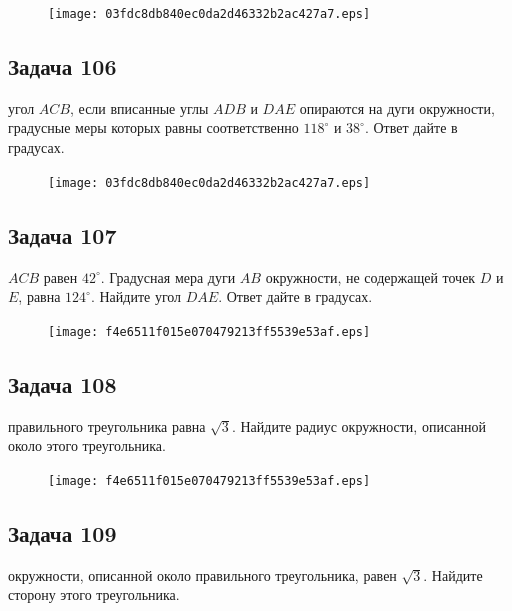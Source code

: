 \documentclass[a4paper,10pt]{article} %
\begin{document}
\begin{spacing}{1.0}
{\begin{figure}{\texttt{[image: 03fdc8db840ec0da2d46332b2ac427a7.eps]}}\end{figure}
\subsection*{Задача 106}
 угол $ACB$, если вписанные углы $ADB$ и $DAE$ опираются на дуги окружности, градусные меры которых равны соответственно $118^\circ$ и $38^\circ$. Ответ дайте в градусах.

\vspace{1.5cm}

\begin{figure}{\texttt{[image: 03fdc8db840ec0da2d46332b2ac427a7.eps]}}\end{figure}
\subsection*{Задача 107}
 $ACB$ равен $42^\circ$. Градусная мера дуги $AB$ окружности, не содержащей точек $D$ и $E$, равна $124^\circ$. Найдите угол $DAE$. Ответ дайте в градусах.

\vspace{3cm}

\begin{figure}{\texttt{[image: f4e6511f015e070479213ff5539e53af.eps]}}\end{figure}
\subsection*{Задача 108}
 правильного треугольника равна $\sqrt{3}$. Найдите радиус окружности, описанной около этого треугольника.

\vspace{1.5cm}

\begin{figure}{\texttt{[image: f4e6511f015e070479213ff5539e53af.eps]}}\end{figure}
\subsection*{Задача 109}
 окружности, описанной около правильного треугольника, равен $\sqrt{3}$. Найдите сторону этого треугольника.

\vspace{1.5cm}

}
\end{spacing}
\end{document}
